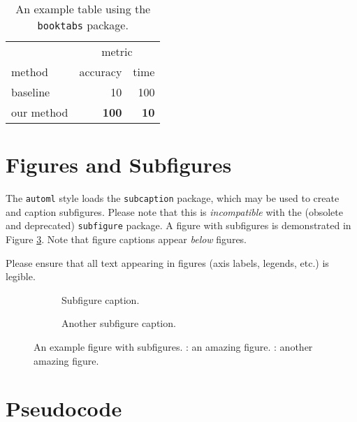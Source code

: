 \documentclass[11pt]{article}
\begin{document}
\begin{table}
  \caption{An example table using the \texttt{booktabs} package.}
  \label{example_table}
  \centering
  \begin{tabular}{lrr}
    \toprule
    & \multicolumn{2}{c}{metric} \\
    \cmidrule{2-3}
    method & accuracy & time \\
    \midrule
    baseline & 10 & 100 \\
    our method & \textbf{100} & \textbf{10} \\
    \bottomrule
  \end{tabular}
\end{table}

\section{Figures and Subfigures}

The \texttt{automl} style loads the \texttt{subcaption} package, which may be
used to create and caption subfigures. Please note that this is
\emph{incompatible} with the (obsolete and deprecated) \texttt{subfigure}
package. A figure with subfigures is demonstrated in Figure
\ref{example_figure}. Note that figure captions appear \emph{below} figures.

Please ensure that all text appearing in figures (axis labels, legends, etc.)
is legible.

\begin{figure}
  \begin{subfigure}[t]{0.5\linewidth}
    \centering
    \caption{Subfigure caption.}
    \label{example_figure_left}
  \end{subfigure}
  \begin{subfigure}[t]{0.5\linewidth}
    \centering
    \caption{Another subfigure caption.}
    \label{example_figure_right}
  \end{subfigure}
  \caption{An example figure with subfigures. : an
    amazing figure. : another amazing figure.}
  \label{example_figure}
\end{figure}

\section{Pseudocode}
\label{sec:code}
\end{document}
